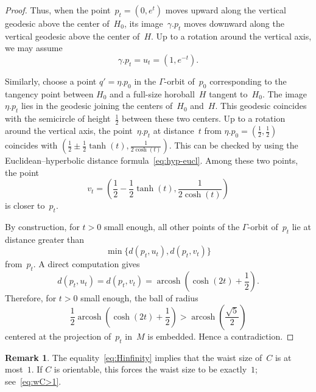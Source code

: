 \documentclass[11pt,reqno]{amsart}
\theoremstyle{definition}
\newtheorem{remark}[theorem]{Remark}
\numberwithin{equation}{section}
\DeclareMathOperator{\arcosh}{arcosh}
\numberwithin{equation}{section}
\begin{document}
\begin{proof}
Thus, when the point~$p_t=(0,e^t)$ moves upward along the vertical geodesic above the center of~$H_0$, its image~$\gamma.p_t$ moves downward along the vertical geodesic above the center of~$H$.
Up to a rotation around the vertical axis, we may assume 
\[
\gamma.p_t=u_t=(1,e^{-t}).
\]

Similarly, choose a point $q'=\eta.p_0$ in the $\Gamma$-orbit of~$p_0$ corresponding to the tangency point between $H_0$ and a full-size horoball~$H$ tangent to~$H_0$.
The image~$\eta.p_t$ lies in the geodesic joining the centers of~$H_0$ and~$H$.
This geodesic coincides with the semicircle of height~$\frac{1}{2}$ between these two centers.
Up to a rotation around the vertical axis, the point~$\eta.p_t$ at distance~$t$ from $\eta.p_0=(\frac{1}{2},\frac{1}{2})$ coincides with
$
\left( \frac{1}{2} \pm \frac{1}{2} \tanh(t), \frac{1}{2 \cosh(t)} \right).
$
This can be checked by using the Euclidean--hyperbolic distance formula~\eqref{eq:hyp-eucl}.
Among these two points, the point
\[
v_t = \left( \frac{1}{2} - \frac{1}{2} \tanh(t), \frac{1}{2 \cosh(t)} \right)
\]
is closer to~$p_t$.

By construction, for $t>0$ small enough, all other points of the $\Gamma$-orbit of~$p_t$ lie at distance greater than 
\[
\min \{ d(p_t,u_t), d(p_t,v_t) \}
\]
from~$p_t$.
A direct computation gives
\[
d(p_t,u_t) = d(p_t,v_t) = \arcosh \left( \cosh(2t) + \frac{1}{2} \right).
\]
Therefore, for $t>0$ small enough, the ball of radius
\[
\frac{1}{2} \arcosh \left( \cosh(2t) + \frac{1}{2} \right) > \arcosh \left( \frac{\sqrt{5}}{2} \right)
\]
centered at the projection of~$p_t$ in~$M$ is embedded.
Hence a contradiction.
\end{proof}

\begin{remark} \label{rem:w>1}
The equality~\eqref{eq:Hinfinity} implies that the waist size of~$C$ is at most~$1$.
If $C$ is orientable, this forces the waist size to be exactly~$1$; see~\eqref{eq:wC>1}.
\end{remark}




\forget
\end{document}
